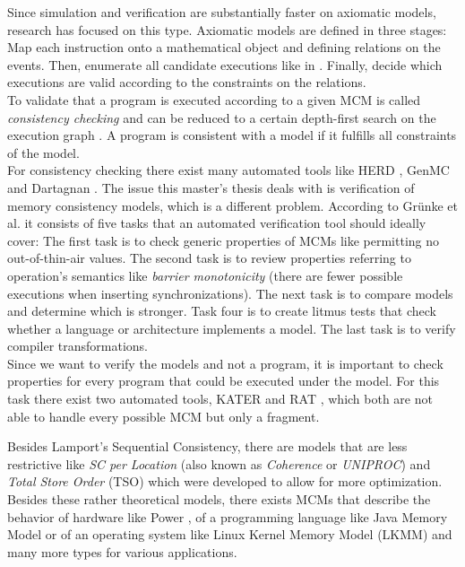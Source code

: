 \documentclass[a4paper,twoside,12pt, english]{article}
\begin{document}
Since simulation \cite{Mad+10} and verification \cite{Alg+13} are substantially faster on axiomatic models, research has focused on this type. 
Axiomatic models are defined in three stages: Map each instruction onto a mathematical object and defining relations on the events. Then, enumerate all candidate executions like in . Finally, decide which executions are valid according to the constraints on the relations. \\
To validate that a program is executed according to a given MCM is called \textit{consistency checking} and can be reduced to a certain depth-first search on the execution graph \cite{Kok+23}. A program is consistent with a model if it fulfills all constraints of the model. \\
For consistency checking there exist many automated tools like HERD \cite{Alg+14}, GenMC \cite{KokVaf21} and Dartagnan \cite{Pon+18}. 
The issue this master's thesis deals with is verification of memory consistency models, which is a different problem. \newpage According to Grünke et al. \cite{Gru+26} it consists of five tasks that an automated verification tool should ideally cover:
The first task is to check generic properties of MCMs like permitting no out-of-thin-air values. The second task is to review properties referring to operation's semantics like \textit{barrier monotonicity} (there are fewer possible executions when inserting synchronizations). The next task is to compare models and determine which is stronger. Task four is to create litmus tests that check whether a language or architecture implements a model. The last task is to verify compiler transformations. \\
Since we want to verify the models and not a program, it is important to check properties for every program that could be executed under the model.
For this task there exist two automated tools, KATER \cite{Kok+23} and RAT \cite{Gru+26}, which both are not able to handle every possible MCM but only a fragment.

Besides Lamport's Sequential Consistency, there are models that are less restrictive like \textit{SC per Location} (also known as \textit{Coherence} or \textit{UNIPROC}) and \textit{Total Store Order} (TSO)\cite{SPA92} which were developed to allow for more optimization. Besides these rather theoretical models, there exists MCMs that describe the behavior of hardware like Power \cite{Mad+12}, of a programming language like Java Memory Model \cite{Man+05} or of an operating system like Linux Kernel Memory Model (LKMM) \cite{Alg+18,LKM25} and many more types for various applications.
\end{document}
